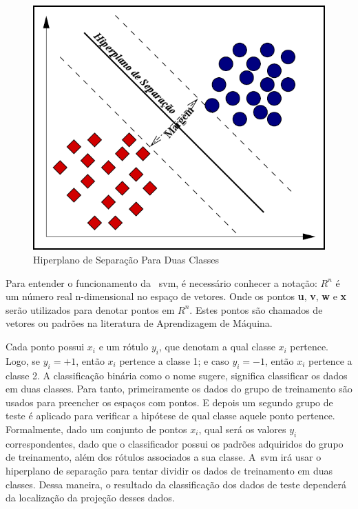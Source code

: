 \begin{figure}
 \centering
 \includegraphics[scale=0.4]{./img/svmhyperplane.png}
\caption{Hiperplano de Separação Para Duas Classes}
 \label{fig:hiperplano}
\end{figure}


Para entender o funcionamento da ~\ac{svm}, é necessário conhecer a notação:
\begin{math}
R^{n}
\end{math}
é um número real n-dimensional no espaço de vetores. Onde os pontos \textbf{u}, \textbf{v}, \textbf{w} e \textbf{x} serão utilizados para denotar pontos em 
\begin{math}
R^{n}
\end{math}.
Estes pontos são chamados de vetores ou padrões na literatura de Aprendizagem de Máquina.

Cada ponto possui $x_{i}$ e um rótulo $y_{i}$, que denotam a qual classe $x_{i}$ pertence. Logo, se $y_{i} = + 1$, então $x_{i}$ pertence a classe 1; e caso $y_{i} = - 1$, então $x_{i}$ pertence a classe 2. A classificação binária como o nome sugere, significa classificar os dados em duas classes. Para tanto, primeiramente os dados do grupo de treinamento são usados para preencher os espaços com pontos. E depois um segundo grupo de teste é aplicado para verificar a hipótese de qual classe aquele ponto pertence. Formalmente, dado um conjunto de pontos $x_{i}$, qual será os valores $y_{i}$ correspondentes, dado que o classificador possui os padrões adquiridos do grupo de treinamento, além dos rótulos associados a sua classe. A~\ac{svm} irá usar o hiperplano de separação para tentar dividir os dados de treinamento em duas classes. Dessa maneira, o resultado da classificação dos dados de teste dependerá da localização da projeção desses dados.

